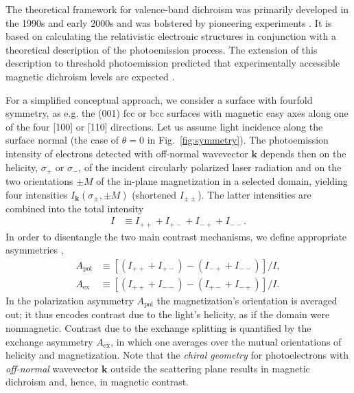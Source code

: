 \documentclass[prl,twocolumn,floatfix,superscriptaddress,aps]{revtex4-2}
\renewcommand{\vec}[1]{\boldsymbol{#1}}
\begin{document}
The theoretical framework for valence-band dichroism was primarily developed in the 1990s and early 2000s \cite{tamura1987, feder1996,henk1996,kuch1996a,feder1998,venus1994,venus1997,kuch2001} and was bolstered by pioneering experiments \cite{venus95, hild2008, hild2009, hild2010}. It is based on calculating the relativistic electronic  structures in conjunction with a theoretical description of the photoemission process. 
The extension of this description to threshold photoemission predicted that experimentally accessible magnetic dichroism levels are expected \cite{feder1998}. 


For a simplified conceptual approach, we consider a surface with fourfold symmetry, as e.g. the (001) fcc or bcc surfaces with magnetic easy axes along one of the four [100] 
or [110] 
directions. Let us assume light incidence along the surface normal (the case of $\theta = 0$ in Fig.~\ref{fig:symmetry}). The photoemission intensity of electrons detected with off-normal wavevector $\vec{k}$ depends then on the helicity, $\sigma_{+}$ or $\sigma_{-}$, of the incident circularly polarized laser radiation and on the two orientations $\pm M$ of the in-plane magnetization in a selected domain, yielding four intensities $I_{\vec{k}}(\sigma_{\pm}, \pm M)$ (shortened $I_{\pm \pm}$). The latter intensities are combined into the total intensity
\begin{align}
    I & \equiv I_{+ +} + I_{+ -} + I_{- +} + I_{- -}. 
\end{align}
In order to disentangle the two main contrast mechanisms, we define appropriate asymmetries \cite{henk1998},
\begin{subequations}
\begin{align}
    A_{\mathrm{pol}} & \equiv \left[ \left( I_{+ +} + I_{+ -} \right) - \left( I_{- +} + I_{- -} \right) \right] / I,
    \label{eq:Apol}
    \\
    A_{\mathrm{ex}} & \equiv \left[ \left( I_{+ +} + I_{- -} \right) - \left( I_{+ -} + I_{- +} \right) \right] / I.
    \label{eq:Aex}
\end{align}    
\end{subequations}
In the polarization asymmetry $A_{\mathrm{pol}}$ the magnetization's orientation is averaged out; it thus encodes contrast due to the light's helicity, as if the domain were nonmagnetic. Contrast due to the exchange splitting is quantified by the exchange asymmetry $A_{\mathrm{ex}}$, in which one averages over the mutual orientations of helicity and magnetization. Note that the \emph{chiral geometry} for photoelectrons with \emph{off-normal} wavevector $\vec{k}$ outside the scattering plane results in magnetic dichroism and, hence, in magnetic contrast.
\end{document}
